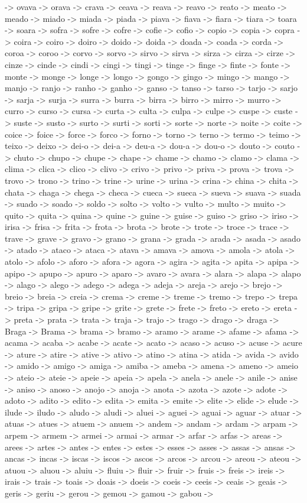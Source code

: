 \documentclass[a4paper,11pt]{article}
\begin{document}
-> ovava -> orava -> crava -> ceava -> reava -> reavo -> reato -> meato -> meado -> miado -> miada -> piada -> piava -> fiava -> fiara -> tiara -> toara -> soara -> sofra -> sofre -> cofre -> cofie -> cofio -> copio -> copia -> copra -> coira -> coiro -> doiro -> doido -> doida -> doada -> coada -> corda -> coroa -> coroo -> corvo -> sorvo -> sirvo -> sirva -> sirza -> cirza -> cirze -> cinze -> cinde -> cindi -> cingi -> tingi -> tinge -> finge -> finte -> fonte -> monte -> monge -> longe -> longo -> gongo -> gingo -> mingo -> mango -> manjo -> ranjo -> ranho -> ganho -> ganso -> tanso -> tarso -> tarjo -> sarjo -> sarja -> surja -> surra -> burra -> birra -> birro -> mirro -> murro -> curro -> curso -> cursa -> curta -> culta -> culpa -> culpe -> cuspe -> custe -> suste -> susto -> surto -> surti -> sorti -> sorte -> norte -> noite -> coite -> coice -> foice -> force -> forco -> forno -> torno -> terno -> termo -> teimo -> teixo -> deixo -> dei-o -> dei-a -> deu-a -> dou-a -> dou-o -> douto -> couto -> chuto -> chupo -> chupe -> chape -> chame -> chamo -> clamo -> clama -> clima -> clica -> clico -> clivo -> crivo -> privo -> priva -> prova -> trova -> trovo -> trono -> trino -> trine -> urine -> urina -> crina -> china -> chita -> chata -> chaga -> chega -> checa -> cueca -> sueca -> sueva -> suava -> suada -> suado -> soado -> soldo -> solto -> volto -> vulto -> multo -> muito -> quito -> quita -> quina -> quine -> guine -> guise -> guiso -> griso -> iriso -> irisa -> frisa -> frita -> frota -> brota -> brote -> trote -> troce -> trace -> trave -> grave -> gravo -> grano -> grana -> grada -> arada -> asada -> asado -> atado -> ataco -> ataca -> atava -> amava -> amova -> amola -> atola -> atolo -> afolo -> aforo -> afora -> agora -> agira -> agita -> apita -> apipa -> apipo -> apupo -> apuro -> aparo -> avaro -> avara -> alara -> alapa -> alapo -> alago -> alego -> adego -> adega -> adeja -> areja -> arejo -> brejo -> breio -> breia -> creia -> crema -> creme -> treme -> tremo -> trepo -> trepa -> tripa -> gripa -> gripe -> grite -> grete -> frete -> freto -> ereto -> ereta -> preta -> prata -> trata -> traja -> trajo -> trago -> drago -> draga -> Braga -> Brama -> brama -> bramo -> aramo -> arame -> afame -> afama -> acama -> acaba -> acabe -> acate -> acato -> acaso -> acuso -> acuse -> acure -> ature -> atire -> ative -> ativo -> atino -> atina -> atida -> avida -> avido -> amido -> amigo -> amiga -> amiba -> ameba -> amena -> ameno -> ameio -> ateio -> ateie -> apeie -> apeia -> apela -> anela -> anele -> anile -> anise -> aniso -> anoso -> anojo -> anoja -> anota -> azota -> azote -> adote -> adoto -> adito -> edito -> edita -> emita -> emite -> elite -> elide -> elude -> ilude -> iludo -> aludo -> aludi -> aluei -> aguei -> aguai -> aguar -> atuar -> atuas -> atues -> atuem -> anuem -> andem -> andam -> ardam -> arpam -> arpem -> armem -> armei -> armai -> armar -> arfar -> arfas -> areas -> arees -> artes -> antes -> entes -> estes -> esses -> asses -> assas -> ansas -> ancas -> incas -> iscas -> iscos -> ascos -> arcos -> arcou -> areou -> ateou -> atuou -> aluou -> aluiu -> fluiu -> fluir -> fruir -> fruis -> freis -> ireis -> irais -> trais -> toais -> doais -> doeis -> coeis -> ceeis -> ceais -> geais -> geris -> geriu -> gerou -> gemou -> gamou -> gabou -> 
\end{document}

